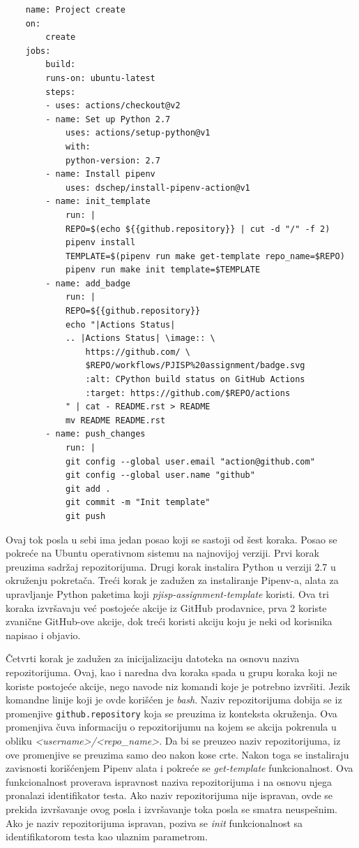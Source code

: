 \documentclass[12pt]{report}
\begin{document}
\begin{verbatim}
    name: Project create
    on:
        create
    jobs:
        build:
        runs-on: ubuntu-latest
        steps:
        - uses: actions/checkout@v2
        - name: Set up Python 2.7
            uses: actions/setup-python@v1
            with:
            python-version: 2.7
        - name: Install pipenv
            uses: dschep/install-pipenv-action@v1
        - name: init_template
            run: |
            REPO=$(echo ${{github.repository}} | cut -d "/" -f 2)
            pipenv install
            TEMPLATE=$(pipenv run make get-template repo_name=$REPO)
            pipenv run make init template=$TEMPLATE
        - name: add_badge
            run: |
            REPO=${{github.repository}}
            echo "|Actions Status|
            .. |Actions Status| \image:: \
                https://github.com/ \
                $REPO/workflows/PJISP%20assignment/badge.svg
                :alt: CPython build status on GitHub Actions
                :target: https://github.com/$REPO/actions
            " | cat - README.rst > README
            mv README README.rst
        - name: push_changes
            run: |
            git config --global user.email "action@github.com"
            git config --global user.name "github"
            git add .
            git commit -m "Init template"
            git push
\end{verbatim}

Ovaj tok posla u sebi ima jedan posao koji se sastoji od šest koraka. Posao se pokreće na Ubuntu operativnom sistemu na najnovijoj verziji. Prvi korak preuzima sadržaj repozitorijuma. Drugi korak instalira Python u verziji 2.7 u okruženju pokretača. Treći korak je zadužen za instaliranje Pipenv-a, alata za upravljanje Python paketima koji \textit{pjisp-assignment-template} koristi. Ova tri koraka izvršavaju već postojeće akcije iz GitHub prodavnice, prva 2 koriste zvanične GitHub-ove akcije, dok treći koristi akciju koju je neki od korisnika napisao i objavio.

Četvrti korak je zadužen za inicijalizaciju datoteka na osnovu naziva repozitorijuma. Ovaj, kao i naredna dva koraka spada u grupu koraka koji ne koriste postojeće akcije, nego navode niz komandi koje je potrebno izvršiti. Jezik komandne linije koji je ovde korišćen je \textit{bash}. Naziv repozitorijuma dobija se iz promenjive \texttt{github.repository} koja se preuzima iz konteksta okruženja. Ova promenjiva čuva informaciju o repozitorijumu na kojem se akcija pokrenula u obliku \textit{<username>/<repo\_name>}. Da bi se preuzeo naziv repozitorijuma, iz ove promenjive se preuzima samo deo nakon kose crte. Nakon toga se instaliraju zavisnosti korišćenjem Pipenv alata i pokreće se \textit{get-template} funkcionalnost. Ova funkcionalnost proverava ispravnost naziva repozitorijuma i na osnovu njega pronalazi identifikator testa. Ako naziv repozitorijuma nije ispravan, ovde se prekida izvršavanje ovog posla i izvršavanje toka posla se smatra neuspešnim. Ako je naziv repozitorijuma ispravan, poziva se \textit{init} funkcionalnost sa identifikatorom testa kao ulaznim parametrom.
\end{document}
